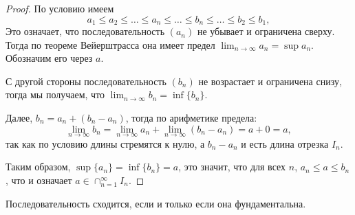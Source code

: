 \begin{proof}
    По условию имеем
    \[
    a_1 \le a_2 \le \ldots \le a_n \le \ldots \le b_n \le \ldots \le b_2 \le b_1,
    \]
    Это означает, что последовательность $(a_n)$ не убывает и ограничена сверху. Тогда по теореме Вейерштрасса она имеет предел $\lim_{n \to \infty} a_n = \sup{a_n}$. Обозначим его через $a$.

    С другой стороны последовательность $(b_n)$ не возрастает и ограничена снизу, тогда мы получаем, что $\lim_{n\to \infty} b_n = \inf\{b_n\}$.

    Далее, $b_n = a_n + (b_n - a_n)$, тогда по арифметике предела:
    \[
     \lim_{n \to \infty}b_n = \lim_{n \to \infty} a_n + \lim_{n \to \infty} (b_n - a_n) = a + 0 =a,
    \]
    так как по условию длины стремятся к нулю, а $b_n - a_n$ и есть длина отрезка $I_n.$

    Таким образом, $\sup\{a_n\} = \inf\{b_n\} =a$, \ie это значит, что для всех $n$, $a_n \le a \le b_n$, что и означает $a \in \cap_{n=1}^\infty I_n.$
\end{proof}


\begin{theorem}\label{Coshy}
   Последовательность сходится, если и только если она фундаментальна.
\end{theorem}

